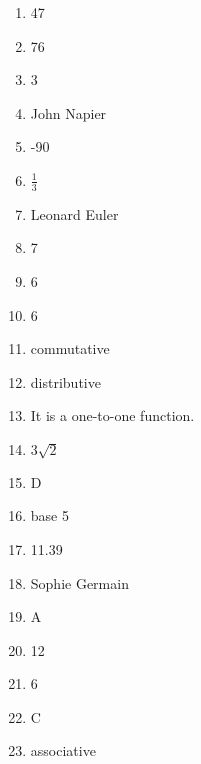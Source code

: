 \documentclass[../uilmath.tex]{subfiles}
\begin{document}
\begin{enumerate}[label=\bfseries\arabic*.]
    \item %
    47

    \item %
    76

    \item %
    3

    \item %
    John Napier 

    \item %
    -90

    \item %
    $\frac{1}{3}$

    \item %
    Leonard Euler 

    \item %
    7

    \item %
    6

    \item %
    6

    \item %
    commutative 

    \item %
    distributive

    \item %
    It is a one-to-one function.

    \item %
    $3\sqrt{2}$

    \item %
    D 

    \item %
    base 5 

    \item %
    11.39 

    \item %
    Sophie Germain 

    \item %
    A 

    \item %
    12 

    \item %
    6

    \item %
    C 

    \item %
    associative 


\end{enumerate}
\end{document}
